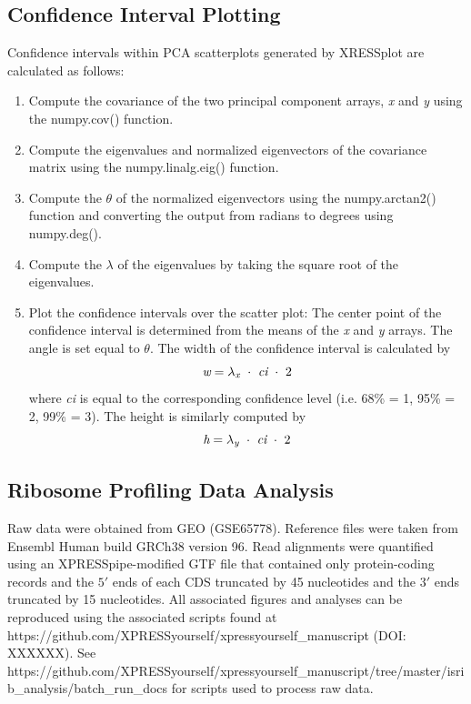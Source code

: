 \documentclass[10pt, oneside]{article}
\begin{document}
\subsection{Confidence Interval Plotting}
Confidence intervals within PCA scatterplots generated by XRESSplot are calculated as follows:

\begin{enumerate}
  \item Compute the covariance of the two principal component arrays, \textit{x} and \textit{y} using the numpy.cov() function.

  \item Compute the eigenvalues and normalized eigenvectors of the covariance matrix using the numpy.linalg.eig() function.

  \item Compute the $\theta$ of the normalized eigenvectors using the numpy.arctan2() function and converting the output from radians to degrees using numpy.deg().

  \item Compute the $\lambda$ of the eigenvalues by taking the square root of the eigenvalues.

  \item Plot the confidence intervals over the scatter plot: The center point of the confidence interval is determined from the means of the \textit{x} and \textit{y} arrays. The angle is set equal to $\theta$. The width of the confidence interval is calculated by
  \[
  \textit{w} = \lambda _{\textit{\scriptsize{x}}}\ \cdot\ \textit{ci}\ \cdot\ 2
  \]
  where \textit{ci} is equal to the corresponding confidence level (i.e. 68\% = 1, 95\% = 2, 99\% = 3). The height is similarly computed by
  \[
  \textit{h} = \lambda _{\textit{\scriptsize{y}}}\ \cdot\ \textit{ci}\ \cdot\ 2
  \]
\end{enumerate}

\subsection{Ribosome Profiling Data Analysis}
Raw data were obtained from GEO (GSE65778). Reference files were taken from Ensembl Human build GRCh38 version 96. Read alignments were quantified using an XPRESSpipe-modified GTF file that contained only protein-coding records and the $5'$ ends of each CDS truncated by 45 nucleotides and the $3'$ ends truncated by 15 nucleotides. All associated figures and analyses can be reproduced using the associated scripts found at https://github.com/XPRESSyourself/xpressyourself\_manuscript (DOI: XXXXXX). See https://github.com/XPRESSyourself/xpressyourself\_manuscript/tree/master/isrib\_analysis/batch\_run\_docs for scripts used to process raw data. \par
\end{document}
